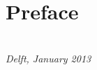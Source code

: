 \chapter*{Preface}
\begin{flushright}
{\makeatletter\itshape
    \@author \\
    
    Delft, January 2013
\makeatother}
\end{flushright}

